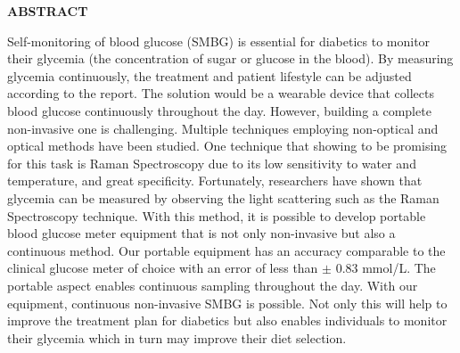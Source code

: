 {}

\begin{center}
    \large{\bf ABSTRACT}
\end{center}

\begin{sloppypar}
Self-monitoring of blood glucose (SMBG) is essential for diabetics to monitor their glycemia (the concentration of sugar or glucose in the blood).
By measuring glycemia continuously, the treatment and patient lifestyle can be adjusted according to the report. 
The solution would be a wearable device that collects blood glucose continuously throughout the day.
However, building a complete non-invasive one is challenging. 
Multiple techniques employing non-optical and optical methods have been studied. 
One technique that showing to be promising for this task is Raman Spectroscopy due to its low sensitivity to water and temperature, and great specificity. 
Fortunately, researchers have shown that glycemia can be measured by observing the light scattering such as the Raman Spectroscopy technique. 
With this method, it is possible to develop portable blood glucose meter equipment that is not only non-invasive but also a continuous method.
Our portable equipment has an accuracy comparable to the clinical glucose meter of choice with an error of less than $\pm$ 0.83 mmol/L.
The portable aspect enables continuous sampling throughout the day. 
With our equipment, continuous non-invasive SMBG is possible. 
Not only this will help to improve the treatment plan for diabetics but also enables individuals to monitor their glycemia which in turn may improve their diet selection.
\end{sloppypar}
